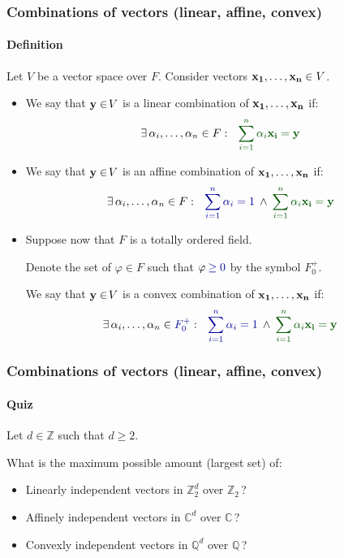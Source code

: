 \documentclass{beamer}
\renewcommand{\.}{\hskip .75pt}
\DeclareMathOperator{\aand}{\;\wedge\;}
\begin{document}
\begin{frame}
	\frametitle{Combinations of vectors (linear, affine, convex)}
	\framesubtitle{Definition}
	
	Let $V$ be a vector space over $F$.		
	Consider vectors $\bold{x_1}, \dots, \bold{x_n} \in V$.
	\smallskip
	
	\begin{itemize}
		\setlength{\abovedisplayskip}{0pt}
		\setlength{\belowdisplayskip}{4pt}
		\pause \item We say that $\bold{y} \in\! V$ is a \textcolor{dred}{linear combination} of $\bold{x_1}, \dots, \bold{x_n}$ if:
		$$\exists\, \alpha_i, \dots, \alpha_n \in F : \ \  \textcolor{dgreen}{\sum_{i=1}^{n} \alpha_i \bold{x_i} = \bold{y}}$$
		\pause \item We say that $\bold{y} \in\! V$ is an \textcolor{dred}{affine combination} of $\bold{x_1}, \dots, \bold{x_n}$ if:
		$$\exists\, \alpha_i, \dots, \alpha_n \in F : \ \   \textcolor{dblue}{\sum_{i=1}^{n} \alpha_i = 1} \aand \textcolor{dgreen}{\sum_{i=1}^{n} \alpha_i \bold{x_i} = \bold{y}}$$
		\pause \item Suppose now that $F$ is a totally ordered field.
		
		Denote the set of $\varphi \in\! F$ such that $\varphi \textcolor{dblue}{\:\ge 0}$ by the symbol \textcolor{dblue}{$F_0^+$}.
		
		We say that $\bold{y} \in\! V$ is a \textcolor{dred}{convex combination} of $\bold{x_1}, \dots, \bold{x_n}$ if:
		$$\exists\, \alpha_i, \dots, \alpha_n \in \textcolor{dblue}{F_0^+} : \ \   \textcolor{dblue}{\sum_{i=1}^{n} \alpha_i = 1} \aand \textcolor{dgreen}{\sum_{i=1}^{n} \alpha_i \bold{x_i} = \bold{y}}$$
	\end{itemize}
\end{frame}

\begin{frame}
	\frametitle{Combinations of vectors (linear, affine, convex)}
	\framesubtitle{Quiz}
	
	Let $d \in \mathbb{Z}$ such that $d \ge 2$. 
	
	What is the \textcolor{dblue}{maximum} possible amount (largest set) of:
	\begin{itemize}
		\item \textcolor{dred}{Linear}ly independent vectors in $\mathbb{Z}_2^d$ over $\mathbb{Z}_2\,$? \\
		\visible<2->{\textcolor{dblue}{$d$}}
		\item \textcolor{dred}{Affine}ly independent vectors in $\mathbb{C}^d$ over $\mathbb{C}\,$? \\
		\visible<3->{\textcolor{dblue}{$d+1$}}
		\item \textcolor{dred}{Convex}ly independent vectors in $\mathbb{Q}^d$ over $\mathbb{Q}\,$? \\
		\visible<4->{\textcolor{dblue}{$\infty$}}
	\end{itemize}

\end{frame}
\end{document}
